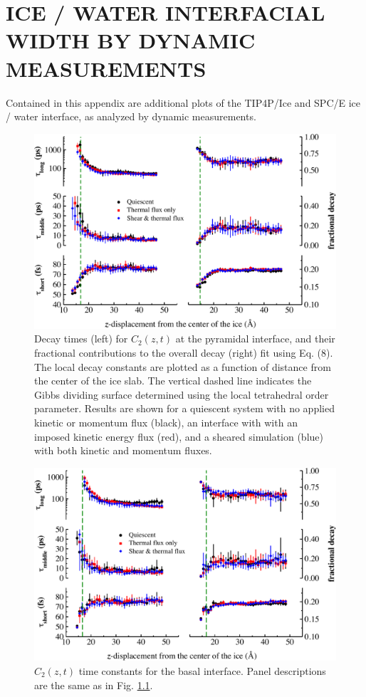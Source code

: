 \chapter{ICE / WATER INTERFACIAL WIDTH BY DYNAMIC MEASUREMENTS}

Contained in this appendix are additional plots of the TIP4P/Ice and SPC/E ice / water interface, as analyzed by dynamic measurements.



\begin{figure}
\includegraphics[width=\linewidth]{Figures/Pyr_lcorrz}
\caption{\label{fig:Pyrorient} Decay times (left) for $C_2(z,t)$ at
  the pyramidal interface, and their fractional contributions to the
  overall decay (right) fit using Eq. (8). The local decay constants
  are plotted as a function of distance from the center of the ice
  slab. The vertical dashed line indicates the Gibbs dividing surface
  determined using the local tetrahedral order parameter.  Results are
  shown for a quiescent system with no applied kinetic or momentum
  flux (black), an interface with with an imposed kinetic energy flux
  (red), and a sheared simulation (blue) with both kinetic and
  momentum fluxes.}
\end{figure}

\begin{figure}
\includegraphics[width=\linewidth]{Figures/Bas_lcorrz}
\caption{\label{fig:Borient} $C_2(z,t)$ time constants for the basal
  interface.  Panel descriptions are the same as in
  Fig. \ref{fig:Pyrorient}. }
\end{figure}

